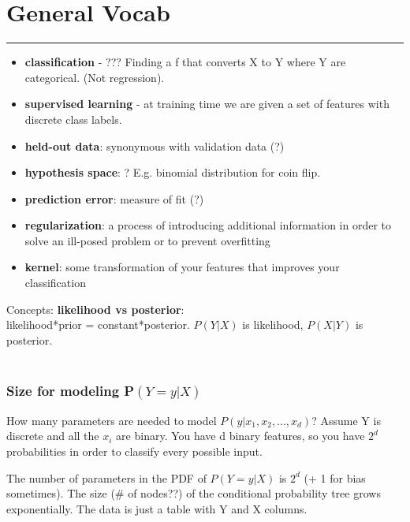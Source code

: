 \section{General Vocab}
\smallskip \hrule height 2pt \smallskip
 
 \begin{itemize}
 	\item \textbf{classification} - ??? Finding a f that converts X to Y where Y are categorical.  (Not regression).  
	\item \textbf{supervised learning} - at training time we are given a set of features with discrete class labels.  %
 	\item \textbf{held-out data}: synonymous with validation data (?)
	\item \textbf{hypothesis space}: ?  E.g. binomial distribution for coin flip.  	
 	\item \textbf{prediction error}: measure of fit (?) 
	\item \textbf{regularization}: a process of introducing additional information in order to solve an ill-posed problem or to prevent overfitting  %
	\item \textbf{kernel}: some transformation of your features that improves your classification %
 \end{itemize}
 
 Concepts:
\textbf{likelihood vs posterior}: \hfill \\

	likelihood*prior = constant*posterior.  $P(Y|X)$ is likelihood, $P(X|Y)$ is posterior.  
\hfill \\
\hfill \\

\subsubsection{Size for modeling P$(Y=y | X)$}
		How many parameters are needed to model $P(y | x_1, x_2, ..., x_d)$?  
		Assume Y is discrete and all the $x_i$ are binary.
		You have d binary features, so you have $2^d$ probabilities in order to classify every possible input.   %
		
		The number of parameters in the PDF of $P(Y=y | X)$ is $2^d$ (+ 1 for bias sometimes).  
		The size (\# of nodes??) of the conditional probability tree grows exponentially.
		The data is just a table with Y and X columns.  
		
